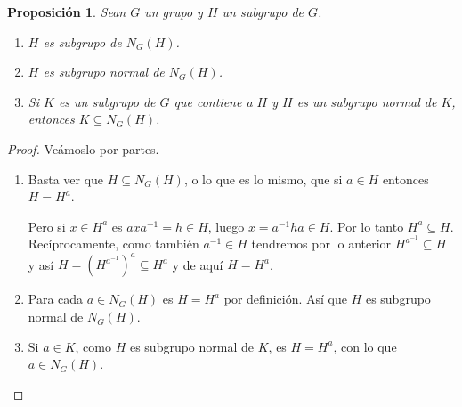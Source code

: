 \documentclass[12pt]{article}
\newtheorem{proposition}[theorem]{Proposición}
\begin{document}
\begin{proposition}Sean $G$ un grupo y $H$ un subgrupo de $G$.
\begin{enumerate}
\item $H$ es subgrupo de $N_G(H)$.
\item $H$ es subgrupo normal de $N_G(H)$.
\item Si $K$ es un subgrupo de $G$ que contiene a $H$ y $H$ es un subgrupo normal de $K$, entonces $K \subseteq N_G(H)$.
\end{enumerate}
\end{proposition}
\begin{proof}Veámoslo por partes.
\begin{enumerate}
\item Basta ver que $H \subseteq N_{G}(H)$, o lo que es lo mismo, que si $a \in H$ entonces $H = H^{a}$.

Pero si $x \in H^{a}$ es $axa^{-1} = h \in H$, luego $x = a^{-1}ha \in H$. Por lo tanto $H^{a} \subseteq H.$ Recíprocamente, como también $a^{-1} \in H$ tendremos por lo anterior $H^{a^{-1}} \subseteq H$ y así $H = (H^{a^{-1}})^{a} \subseteq H^{a}$ y de aquí $H = H^{a}$.
\item Para cada $a \in N_{G}(H)$ es $H = H^{a}$ por definición. Así que $H$ es subgrupo normal de $N_{G}(H)$.
\item Si $a \in K$, como $H$ es subgrupo normal de $K$, es $H = H^{a}$, con lo que $a \in N_{G}(H)$.
\end{enumerate}

\end{proof}
\end{document}

